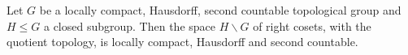 Let $G$ be a locally compact, Hausdorff, second countable topological group and $H\le G$ a closed
subgroup. Then the space $H\backslash G$ of right cosets, with the quotient topology, is locally compact, Hausdorff and second countable.

